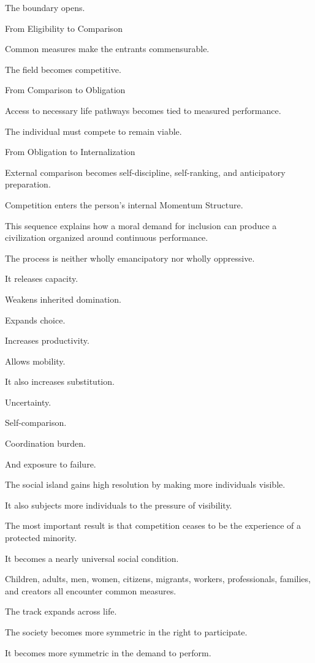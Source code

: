 The boundary opens.

From Eligibility to Comparison

Common measures make the entrants commensurable.

The field becomes competitive.

From Comparison to Obligation

Access to necessary life pathways becomes tied to measured performance.

The individual must compete to remain viable.

From Obligation to Internalization

External comparison becomes self-discipline, self-ranking, and anticipatory preparation.

Competition enters the person’s internal Momentum Structure.

This sequence explains how a moral demand for inclusion can produce a civilization organized around continuous performance.

The process is neither wholly emancipatory nor wholly oppressive.

It releases capacity.

Weakens inherited domination.

Expands choice.

Increases productivity.

Allows mobility.

It also increases substitution.

Uncertainty.

Self-comparison.

Coordination burden.

And exposure to failure.

The social island gains high resolution by making more individuals visible.

It also subjects more individuals to the pressure of visibility.

The most important result is that competition ceases to be the experience of a protected minority.

It becomes a nearly universal social condition.

Children, adults, men, women, citizens, migrants, workers, professionals, families, and creators all encounter common measures.

The track expands across life.

The society becomes more symmetric in the right to participate.

It becomes more symmetric in the demand to perform.

